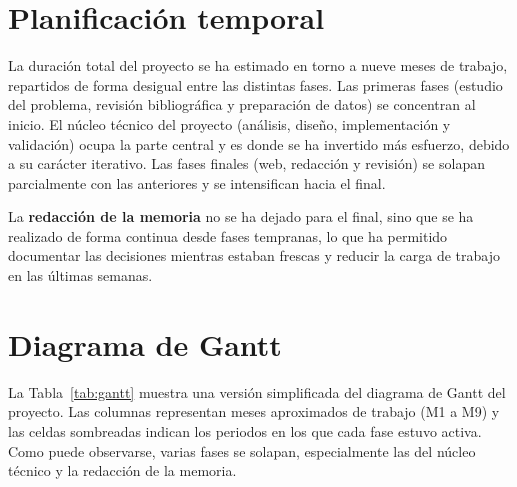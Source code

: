 \section{Planificación temporal}
\label{sec:plan_temporal}

La duración total del proyecto se ha estimado en torno a nueve meses de trabajo, repartidos de forma desigual entre las distintas fases. Las primeras fases (estudio del problema, revisión bibliográfica y preparación de datos) se concentran al inicio. El núcleo técnico del proyecto (análisis, diseño, implementación y validación) ocupa la parte central y es donde se ha invertido más esfuerzo, debido a su carácter iterativo. Las fases finales (web, redacción y revisión) se solapan parcialmente con las anteriores y se intensifican hacia el final.

La \textbf{redacción de la memoria} no se ha dejado para el final, sino que se ha realizado de forma continua desde fases tempranas, lo que ha permitido documentar las decisiones mientras estaban frescas y reducir la carga de trabajo en las últimas semanas.

\section{Diagrama de Gantt}
\label{sec:plan_gantt}

La Tabla~\ref{tab:gantt} muestra una versión simplificada del diagrama de Gantt del proyecto. Las columnas representan meses aproximados de trabajo (M1 a M9) y las celdas sombreadas indican los periodos en los que cada fase estuvo activa. Como puede observarse, varias fases se solapan, especialmente las del núcleo técnico y la redacción de la memoria.

